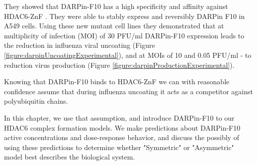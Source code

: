 They showed that DARPin-F10 has a high specificity and affinity against HDAC6-ZnF \cite{DarpinData}. They were able to stably express and reversibly DARPin F10 in A549 cells. Using these new mutant cell lines they demonstrated that at multiplicity of infection (MOI) of 30 PFU/ml DARPin-F10 expression leads to the reduction in influenza viral uncoating (Figure \ref{figure:darpinUncoatingExperimental}), and at MOIs of 10 and 0.05 PFU/ml - to reduction virus production (Figure \ref{figure:darpinProductionExperimental}).

Knowing that DARPin-F10 binds to HDAC6-ZnF we can with reasonable confidence assume that during influenza uncoating it acts as a competitor against polyubiquitin chains. 

In this chapter, we use that assumption, and introduce DARPin-F10 to our HDAC6 complex formation models. We make predictions about DARPin-F10 active concentrations and dose-response behavior, and discuss the possibly of using these predictions to determine whether "Symmetric" or "Asymmetric" model best describes the biological system.